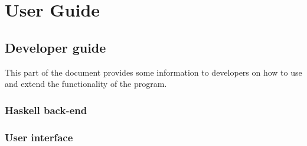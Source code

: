\chapter{User Guide}
\label{chap:Guide}

\section{Developer guide}

This part of the document provides some information to developers on how to use and extend the functionality of the program.

\subsection{Haskell back-end}
\subsection{User interface}
